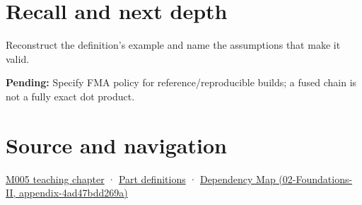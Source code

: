 \section{Recall and next depth}\label{appendix-41e8ef22a21e-recall-and-next-depth}

Reconstruct the definition's example and name the assumptions that make it valid.

\textbf{Pending:} Specify FMA policy for reference/reproducible builds; a fused chain is not a fully exact dot product.

\section{Source and navigation}\label{appendix-41e8ef22a21e-source-and-navigation}

\href{Continuous\%20Notes/Computing\%20Foundations\%20-\%20From\%20Bits\%20to\%20C++\%20and\%20Systems\%20APIs\#When\%20arithmetic\%20meets\%20uncertainty}{M005 teaching chapter} · \hyperref[appendix-fd090d982a15-m005---parts-77-88]{Part definitions} · \href{../02-Foundations-II/main.pdf\#nameddest=appendix-4ad47bdd269a}{Dependency Map (02-Foundations-II, appendix-4ad47bdd269a)}
